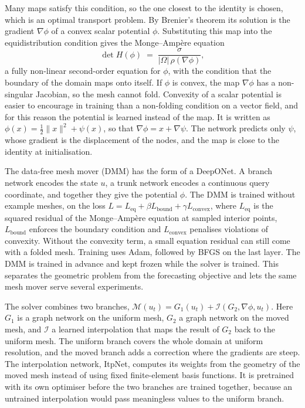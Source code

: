 Many maps satisfy this condition, so the one closest to the identity is
chosen, which is an optimal transport problem. By Brenier's theorem its
solution is the gradient $\nabla\phi$ of a convex scalar potential $\phi$.
Substituting this map into the equidistribution condition gives the
Monge--Amp\`ere equation
\[
  \det H(\phi) \;=\; \frac{\sigma}{|\Omega| \, \rho(\nabla \phi)},
\]
a fully non-linear second-order equation for $\phi$, with the condition
that the boundary of the domain maps onto itself. If $\phi$ is convex, the
map $\nabla\phi$ has a non-singular Jacobian, so the mesh cannot fold.
Convexity of a scalar potential is easier to encourage in training than a
non-folding condition on a vector field, and for this reason the potential
is learned instead of the map. It is written as
$\phi(x) = \tfrac12 \lVert x \rVert^2 + \psi(x)$, so that
$\nabla\phi = x + \nabla\psi$. The network predicts only $\psi$, whose
gradient is the displacement of the nodes, and the map is close to the
identity at initialisation.

The data-free mesh mover (DMM) has the form of a DeepONet. A branch network
encodes the state $u$, a trunk network encodes a continuous query
coordinate, and together they give the potential $\phi$. The DMM is
trained without example meshes, on the loss
$L = L_{\text{eq}} + \beta L_{\text{bound}} + \gamma L_{\text{convex}}$,
where $L_{\text{eq}}$ is the squared residual of the Monge--Amp\`ere
equation at sampled interior points, $L_{\text{bound}}$ enforces the
boundary condition and $L_{\text{convex}}$ penalises violations of
convexity. Without the convexity term, a small equation residual can still
come with a folded mesh. Training uses Adam, followed by BFGS on the last
layer. The DMM is trained in advance and kept frozen while the solver is
trained. This separates the geometric problem from the forecasting
objective and lets the same mesh mover serve several experiments.

The solver combines two branches,
$\mathcal{M}(u_t) = G_1(u_t) + \mathcal{I}(G_2, \nabla\phi, u_t)$. Here
$G_1$ is a graph network on the uniform mesh, $G_2$ a graph network on the
moved mesh, and $\mathcal{I}$ a learned interpolation that maps the result
of $G_2$ back to the uniform mesh. The uniform branch covers the whole
domain at uniform resolution, and the moved branch adds a correction where
the gradients are steep. The interpolation network, ItpNet, computes its
weights from the geometry of the moved mesh instead of using fixed
finite-element basis functions. It is pretrained with its own optimiser
before the two branches are trained together, because an untrained
interpolation would pass meaningless values to the uniform branch.

